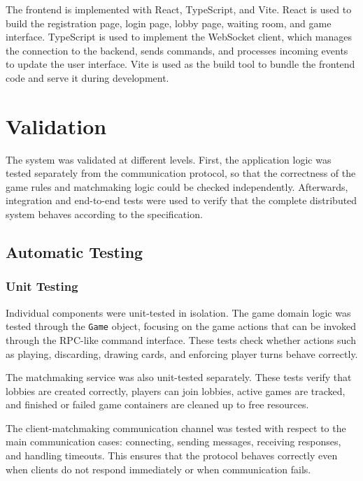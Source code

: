 \documentclass{scrartcl}
\begin{document}
The frontend is implemented with React, TypeScript, and Vite. 
React is used to build the registration page, login page, lobby page, waiting room, and game interface. 
TypeScript is used to implement the WebSocket client, which manages the connection to the backend, sends commands, and processes incoming events to update the user interface.
Vite is used as the build tool to bundle the frontend code and serve it during development.
\newpage

\section{Validation}\label{validation}

The system was validated at different levels. First, the application logic was tested separately from the communication protocol, so that the correctness of the game rules and matchmaking logic could be checked independently. Afterwards, integration and end-to-end tests were used to verify that the complete distributed system behaves according to the specification.

\subsection{Automatic Testing}\label{automatic-testing}

\subsubsection{Unit Testing}

Individual components were unit-tested in isolation. The game domain logic was tested through the \texttt{Game} object, focusing on the game actions that can be invoked through the RPC-like command interface. These tests check whether actions such as playing, discarding, drawing cards, and enforcing player turns behave correctly.

The matchmaking service was also unit-tested separately. These tests verify that lobbies are created correctly, players can join lobbies, active games are tracked, and finished or failed game containers are cleaned up to free resources.

The client-matchmaking communication channel was tested with respect to the main communication cases: connecting, sending messages, receiving responses, and handling timeouts. This ensures that the protocol behaves correctly even when clients do not respond immediately or when communication fails.
\end{document}
